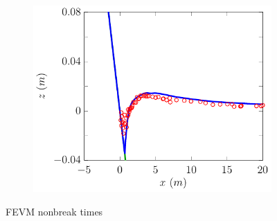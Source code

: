 \begin{figure}
\begin{subfigure}{0.5\textwidth}
		\includegraphics[width=\textwidth]{./chp6/figures/Experiment/Synolakis/H0p0185/FEVM/70s.pdf}
	\end{subfigure}
	\caption{FEVM nonbreak times}
	\label{fig:SynolakisFEVMNoBreak}
\end{figure}

